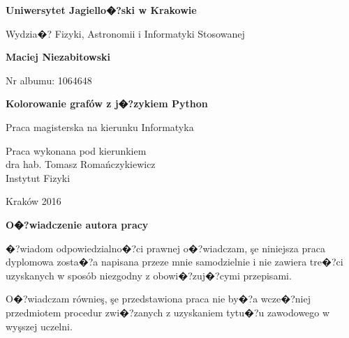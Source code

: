 \documentclass[12pt,a4paper]{mwrep}
\begin{document}
\setcounter{secnumdepth}{3}
\begin{titlepage}

\begin{center}
\textbf{\Large Uniwersytet Jagiello�?ski w Krakowie}
\end{center}

\begin{center}
Wydzia�? Fizyki, Astronomii i Informatyki Stosowanej
\end{center}

\vfill
\begin{center}
\textbf{\large Maciej Niezabitowski}
\end{center}

\begin{center}
Nr albumu: 1064648
\end{center}

\vfill
\begin{center}
\textbf{\LARGE Kolorowanie grafów z j�?zykiem Python}
\end{center}

\begin{center}
Praca magisterska na kierunku Informatyka
\end{center}

\vfill
\begin{flushright}
Praca wykonana pod kierunkiem\\
dra hab. Tomasz Romańczykiewicz \\
Instytut Fizyki
\end{flushright}

\vfill
\begin{center}
Kraków 2016
\end{center}

\end{titlepage}


\thispagestyle{empty}

\begin{flushleft}
\textbf{\large O�?wiadczenie autora pracy}
\end{flushleft}

�?wiadom odpowiedzialno�?ci prawnej o�?wiadczam, şe niniejsza
praca dyplomowa zosta�?a napisana przeze mnie samodzielnie
i nie zawiera tre�?ci uzyskanych w sposób niezgodny
z obowi�?zuj�?cymi przepisami.

O�?wiadczam równieş, şe przedstawiona praca nie by�?a wcze�?niej
przedmiotem procedur zwi�?zanych z uzyskaniem tytu�?u
zawodowego w wyşszej uczelni.
\end{document}
